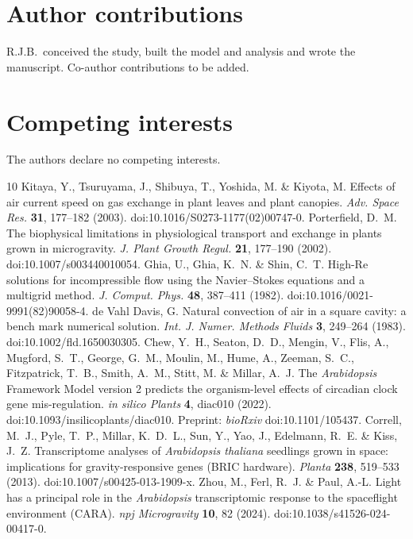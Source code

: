 \documentclass[10pt]{article}
\begin{document}
\section*{Author contributions}
R.J.B.\ conceived the study, built the model and analysis and wrote the manuscript. Co-author contributions to be added.

\section*{Competing interests}
The authors declare no competing interests.

\begin{thebibliography}{10}\small
{} Kitaya, Y., Tsuruyama, J., Shibuya, T., Yoshida, M. \& Kiyota, M. Effects of air current speed on gas exchange in plant leaves and plant canopies. \textit{Adv. Space Res.} \textbf{31}, 177--182 (2003). doi:10.1016/S0273-1177(02)00747-0.
 Porterfield, D.~M. The biophysical limitations in physiological transport and exchange in plants grown in microgravity. \textit{J. Plant Growth Regul.} \textbf{21}, 177--190 (2002). doi:10.1007/s003440010054.
 Ghia, U., Ghia, K.~N. \& Shin, C.~T. High-Re solutions for incompressible flow using the Navier--Stokes equations and a multigrid method. \textit{J. Comput. Phys.} \textbf{48}, 387--411 (1982). doi:10.1016/0021-9991(82)90058-4.
 de Vahl Davis, G. Natural convection of air in a square cavity: a bench mark numerical solution. \textit{Int. J. Numer. Methods Fluids} \textbf{3}, 249--264 (1983). doi:10.1002/fld.1650030305.
 Chew, Y.~H., Seaton, D.~D., Mengin, V., Flis, A., Mugford, S.~T., George, G.~M., Moulin, M., Hume, A., Zeeman, S.~C., Fitzpatrick, T.~B., Smith, A.~M., Stitt, M. \& Millar, A.~J. The \textit{Arabidopsis} Framework Model version 2 predicts the organism-level effects of circadian clock gene mis-regulation. \textit{in silico Plants} \textbf{4}, diac010 (2022). doi:10.1093/insilicoplants/diac010. Preprint: \textit{bioRxiv} doi:10.1101/105437.
 Correll, M.~J., Pyle, T.~P., Millar, K.~D.~L., Sun, Y., Yao, J., Edelmann, R.~E. \& Kiss, J.~Z. Transcriptome analyses of \textit{Arabidopsis thaliana} seedlings grown in space: implications for gravity-responsive genes (BRIC hardware). \textit{Planta} \textbf{238}, 519--533 (2013). doi:10.1007/s00425-013-1909-x.
 Zhou, M., Ferl, R.~J. \& Paul, A.-L. Light has a principal role in the \textit{Arabidopsis} transcriptomic response to the spaceflight environment (CARA). \textit{npj Microgravity} \textbf{10}, 82 (2024). doi:10.1038/s41526-024-00417-0.

\end{thebibliography}
\end{document}
